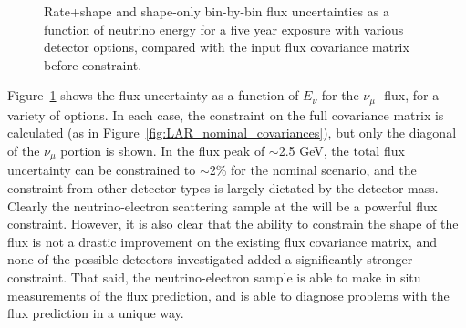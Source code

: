 \begin{figure}[htbp]
  \centering
  \caption[Rate+shape and shape-only bin-by-bin flux uncertainties]{Rate+shape and shape-only bin-by-bin flux uncertainties as a function of neutrino energy for a five year exposure with various detector options, compared with the input flux covariance matrix before constraint.}
  \label{fig:nominal_det_constraint}
\end{figure}
Figure~\ref{fig:nominal_det_constraint} shows the flux uncertainty as a function of $E_{\nu}$ for the $\nu_{\mu}$- flux, for a variety of  options. In each case, the constraint on the full covariance matrix is calculated (as in Figure~\ref{fig:LAR_nominal_covariances}), but only the diagonal of the $\nu_{\mu}$ portion is shown. In the flux peak of $\sim$2.5 GeV, the total flux uncertainty can be constrained to $\sim$2\% for the nominal  scenario, and the constraint from other detector types is largely dictated by the detector mass. Clearly the neutrino-electron scattering sample at the   will be a powerful flux constraint. However, it is also clear that the ability to constrain the shape of the flux is not a drastic improvement on the existing flux covariance matrix, and none of the possible detectors investigated added a significantly stronger constraint. That said, the neutrino-electron sample is able to make in situ measurements of the flux prediction, and is able to diagnose problems with the flux prediction in a unique way.


